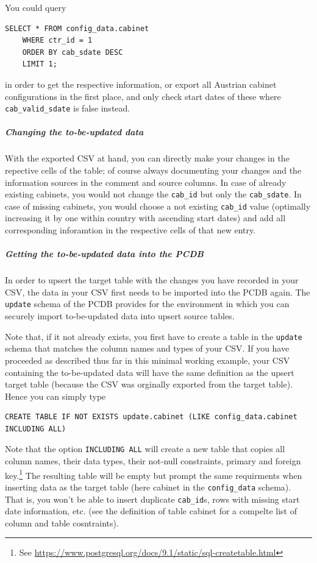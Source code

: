 You could query 
\begin{lstlisting}[language=postgreSQL]
SELECT * FROM config_data.cabinet 
	WHERE ctr_id = 1
	ORDER BY cab_sdate DESC
	LIMIT 1;
\end{lstlisting}
in order to get the respective information, or export all Austrian cabinet configurations in the first place, and only check start dates of these where  \texttt{cab\_valid\_sdate} is false instead.

\subparagraph{Changing the to-be-updated data}
With the exported CSV at hand, you can directly make your changes in the repective cells of the table; of course always documenting your changes and the information sources in the comment and source columns.
In case of already existing cabinets, you would not change the \texttt{cab\_id} but only the \texttt{cab\_sdate}.
In case of missing cabinets, you would choose a not existing \texttt{cab\_id} value (optimally increasing it by one within country with ascending start dates) and add all corresponding inforamtion in the respective cells of that new entry.

\subparagraph{Getting the to-be-updated data into the PCDB}
In order to upsert the target table with the changes you have recorded in your CSV, the data in your CSV first needs to be imported into the PCDB again.
The \texttt{update} schema of the PCDB provides for the environment in which you can securely import to-be-updated data into upsert source tables.

Note that, if it not already exists, you first have to create a table in the \texttt{update} schema that matches the column names and types of your CSV.
If you have proceeded as described thus far in this minimal working example, your CSV containing the to-be-updated data will have the same definition as the upsert target table (because the CSV was orginally exported from the target table).
Hence you can simply type 
\begin{lstlisting}[language=postgreSQL]
CREATE TABLE IF NOT EXISTS update.cabinet (LIKE config_data.cabinet INCLUDING ALL)
\end{lstlisting}
Note that the option \texttt{INCLUDING ALL} will create a new table that copies all column names, their data types, their not-null constraints, primary and foreign key.\footnote{See \url{https://www.postgresql.org/docs/9.1/static/sql-createtable.html}}
The resulting table will be empty but prompt the same requirments when inserting data as the target table (here cabinet in the \texttt{config\_data} schema). 
That is, you won't be able to insert duplicate \texttt{cab\_id}s, rows with missing start date information, etc. (see the definition of table cabinet for a compelte list of column and table cosntraints).

